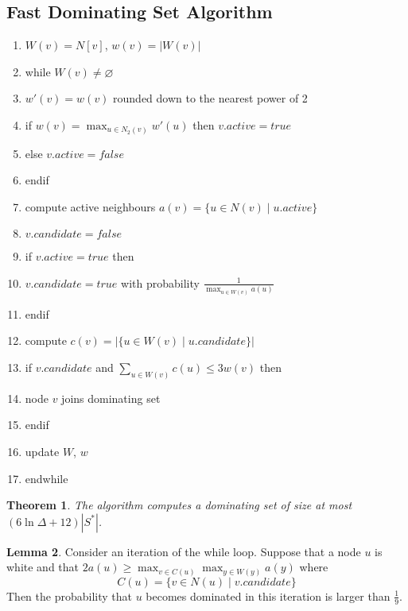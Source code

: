 \documentclass[a4paper, 12pt]{article}
\theoremstyle{plain}
\newtheorem{theorem}{Theorem}[section] %
\theoremstyle{definition}
\theoremstyle{lemma}
\newtheorem{lemma}[theorem]{Lemma}
\theoremstyle{remark}
\theoremstyle{corollary}
\theoremstyle{example}
\begin{document}
	\subsection{Fast Dominating Set Algorithm}
	\begin{enumerate}
		\item $W(v) = N[v]$, $w(v) = \left|W(v)\right|$
		\item while $W(v) \neq \varnothing$
		\item $w'(v) = w(v)$ rounded down to the nearest power of 2
		\item if $w(v) = \max_{u \in N_2(v)} w'(u)$ then $v.active = true$
		\item else $v.active = false$
		\item endif
		\item compute active neighbours $a(v) = \{u \in N(v) \mid u.active\}$
		\item $v.candidate = false$
		\item if $v.active = true$ then
		\item $v.candidate = true$ with probability $\frac{1}{\max_{u \in W(v)}a(u)}$
		\item endif
		\item compute $c(v) = \left|\{u \in W(v) \mid u.candidate\}\right|$
		\item if $v.candidate$ and $\sum_{u \in W(v)} c(u) \leq 3w(v)$ then
		\item node $v$ joins dominating set
		\item endif
		\item update $W$, $w$
		\item endwhile
	\end{enumerate}
	\begin{theorem}
		The algorithm computes a dominating set of size at most $(6\ln \Delta + 12)\left|S^*\right|$.
	\end{theorem}
	\begin{lemma}
		Consider an iteration of the while loop. Suppose that a node $u$ is white and that $2a(u) \geq \max_{v \in C(u)} \max_{y \in W(y)} a(y)$ where \[C(u) = \{v \in N(u) \mid v.candidate\}\] Then the probability that $u$ becomes dominated in this iteration is larger than $\frac{1}{9}$.
	\end{lemma}
\end{document}
